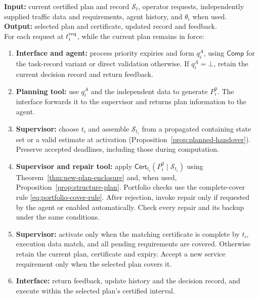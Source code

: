 \documentclass[preprint,12pt]{elsarticle}
\theoremstyle{definition}
\theoremstyle{plain}
\theoremstyle{definition}
\theoremstyle{plain}
\begin{document}
\begin{algorithm}[!htbp]
\caption{Planning requests and certified execution}
\label{alg:agent-execution}
\begin{minipage}{\linewidth}
\small
\textbf{Input:} current certified plan and record $\mathcal S_t$,
operator requests, independently supplied traffic data and requirements,
agent history, and $\theta_i$ when used.\\
\textbf{Output:} selected plan and certificate, updated record and feedback.\\
For each request at $t_i^{\rm req}$, while the current plan remains in force:
\begin{enumerate}
\setlength{\itemsep}{2pt}
\item \label{step:request}\textbf{Interface and agent:} process priority
expiries and form $q_i^A$, using $\mathsf{Comp}$ for the task-record
variant or direct validation otherwise. If $q_i^A=\bot$, retain the
current decision record and return feedback.
\item \label{step:planning}\textbf{Planning tool:} use $q_i^A$ and the
independent data to generate $P_i^0$. The interface forwards it to the
supervisor and returns plan information to the agent.
\item \label{step:activation}\textbf{Supervisor:} choose $t_i$ and
assemble $\mathcal S_{t_i}$ from a propagated containing state set or a
valid estimate at activation (Proposition~\ref{prop:planned-handover}).
Preserve accepted deadlines, including those during computation.
\item \label{step:checking}\textbf{Supervisor and repair tool:} apply
$\mathsf{Cert}_{t_i}(P_i^0\mid\mathcal S_{t_i})$ using
Theorem~\ref{thm:new-plan-enclosure} and, when used,
Proposition~\ref{prop:structure-plan}. Portfolio checks use the complete-cover
rule \eqref{eq:portfolio-cover-rule}. After rejection, invoke repair only
if requested by the agent or enabled automatically. Check every repair
and its backup under the same conditions.
\item \label{step:installation}\textbf{Supervisor:} activate only when
the matching certificate is complete by $t_i$, execution data match, and
all pending requirements are covered. Otherwise retain the current plan,
certificate and expiry. Accept a new service requirement only when the
selected plan covers it.
\item \label{step:feedback}\textbf{Interface:} return feedback, update
history and the decision record, and execute within the selected plan's
certified interval.
\end{enumerate}
\end{minipage}
\end{algorithm}
\FloatBarrier
\end{document}
